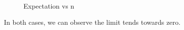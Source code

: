 \documentclass[journal,12pt,twocolumn]{IEEEtran}
\theoremstyle{remark}
\begin{document}
\begin{enumerate}
\begin{figure}[h!]
    \caption{Expectation vs n}
    \label{fig:st_2023_32_figure}
\end{figure}
In both cases, we can observe the limit tends towards zero.
\end{enumerate}
\end{document}
